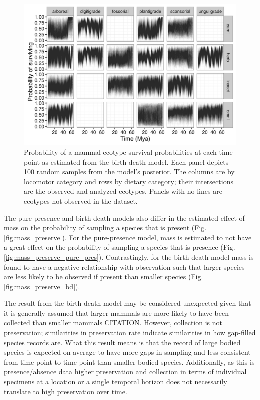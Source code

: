 \documentclass[12pt,letterpaper]{article}
\begin{document}
\begin{figure}[ht]
  \centering
  \includegraphics[width=\textwidth,height=0.5\textheight,keepaspectratio=true]{figure/ecotype_survival_bd}
  \caption[Ecotype survival probability estimated from the birth-death model]{Probability of a mammal ecotype survival probabilities at each time point as estimated from the birth-death model. Each panel depicts 100 random samples from the model's posterior. The columns are by locomotor category and rows by dietary category; their intersections are the observed and analyzed ecotypes. Panels with no lines are ecotypes not observed in the dataset.}
  \label{fig:eco_survival}
\end{figure}





The pure-presence and birth-death models also differ in the estimated effect of mass on the probability of sampling a species that is present (Fig. \ref{fig:mass_preserve}). For the pure-presence model, mass is estimated to not have a great effect on the probability of sampling a species that is presence (Fig. \ref{fig:mass_preserve_pure_pres}). Contrastingly, for the birth-death model mass is found to have a negative relationship with observation such that larger species are less likely to be observed if present than smaller species (Fig. \ref{fig:mass_preserve_bd}). 

The result from the birth-death model may be considered unexpected given that it is generally assumed that larger mammals are more likely to have been collected than smaller mammals CITATION. However, collection is not preservation; similarities in preservation rate indicate similarities in how gap-filled species records are. What this result means is that the record of large bodied species is expected on average to have more gaps in sampling and less consistent from time point to time point than smaller bodied species. Additionally, as this is presence/absence data higher preservation and collection in terms of individual specimens at a location or a single temporal horizon does not necessarily translate to high preservation over time.
\end{document}

